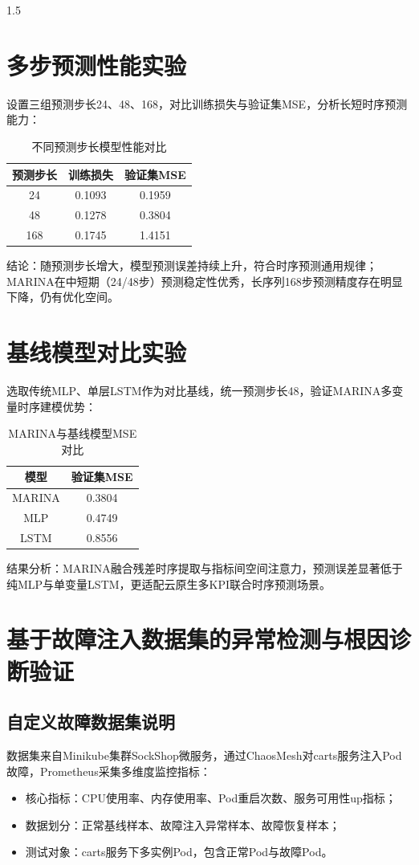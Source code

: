 \documentclass[a4paper,12pt]{report}
\begin{document}
\begin{spacing}{1.5}
\section{多步预测性能实验}
设置三组预测步长24、48、168，对比训练损失与验证集MSE，分析长短时序预测能力：
\begin{table}[htbp]
\centering
\caption{不同预测步长模型性能对比}
\begin{tabular}{ccc}
\toprule
\textbf{预测步长} & \textbf{训练损失} & \textbf{验证集MSE} \\
\midrule
24 & 0.1093 & 0.1959 \\
48 & 0.1278 & 0.3804 \\
168 & 0.1745 & 1.4151 \\
\bottomrule
\end{tabular}
\end{table}

结论：随预测步长增大，模型预测误差持续上升，符合时序预测通用规律；MARINA在中短期（24/48步）预测稳定性优秀，长序列168步预测精度存在明显下降，仍有优化空间。

\section{基线模型对比实验}
选取传统MLP、单层LSTM作为对比基线，统一预测步长48，验证MARINA多变量时序建模优势：
\begin{table}[htbp]
\centering
\caption{MARINA与基线模型MSE对比}
\begin{tabular}{cc}
\toprule
\textbf{模型} & \textbf{验证集MSE} \\
\midrule
MARINA & 0.3804 \\
MLP & 0.4749 \\
LSTM & 0.8556 \\
\bottomrule
\end{tabular}
\end{table}

结果分析：MARINA融合残差时序提取与指标间空间注意力，预测误差显著低于纯MLP与单变量LSTM，更适配云原生多KPI联合时序预测场景。

\section{基于故障注入数据集的异常检测与根因诊断验证}
\subsection{自定义故障数据集说明}
数据集来自Minikube集群SockShop微服务，通过ChaosMesh对carts服务注入Pod故障，Prometheus采集多维度监控指标：
\begin{itemize}
    \item 核心指标：CPU使用率、内存使用率、Pod重启次数、服务可用性up指标；
    \item 数据划分：正常基线样本、故障注入异常样本、故障恢复样本；
    \item 测试对象：carts服务下多实例Pod，包含正常Pod与故障Pod。
\end{itemize}


\end{spacing}
\end{document}
